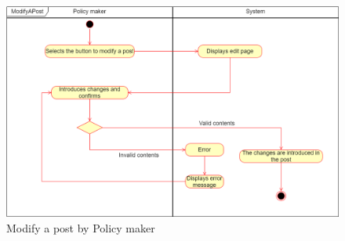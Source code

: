     \begin{figure}[h!]
        \centering
        \includegraphics[scale=0.35]{images/use_cases_diagram/policymaker_modify_post.png}
        \caption{Modify a post by Policy maker}
        \label{fig:policymaker_modify_post}
    \end{figure}
    \FloatBarrier


